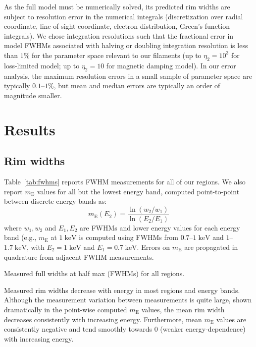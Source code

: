 \documentclass[iop, apj, numberedappendix, twocolappendix]{emulateapj}
\newcommand*{\mt}{\mathrm}
\newcommand*{\unit}[1]{\;\mt{#1}}  %
\newcommand*{\mE}{m_\mt{E}}
\begin{document}
As the full model must be numerically solved, its predicted rim widths are
subject to resolution error in the numerical integrals (discretization over
radial coordinate, line-of-sight coordinate, electron distribution, Green's
function integrals).  We chose integration resolutions such that the
fractional error in model FWHMs associated with halving or doubling integration
resolution is less than $1\%$ for the parameter space relevant to our
filaments (up to $\eta_2 = 10^3$ for loss-limited model; up to $\eta_2 = 10$
for magnetic damping model).  In our error analysis, the maximum resolution
errors in a small sample of parameter space are typically $0.1$--$1\%$,
but mean and median errors are typically an order of magnitude smaller.

\section{Results}

\subsection{Rim widths}
\label{sec:fwhm-results}

Table~\ref{tab:fwhms} reports FWHM measurements for all of our regions.
We also report $\mE$ values for all but the lowest energy band, computed
point-to-point between discrete energy bands as:
\begin{equation}
    \mE(E_2) = \frac{\ln(w_2/w_1)}{\ln(E_2/E_1)}
\end{equation}
where $w_1, w_2$ and $E_1, E_2$ are FWHMs and lower energy values for each
energy band (e.g., $\mE$ at $1 \unit{keV}$ is computed using FWHMs from
$0.7$--$1 \unit{keV}$ and $1$--$1.7 \unit{keV}$, with $E_2 = 1
\unit{keV}$ and $E_1 = 0.7 \unit{keV}$.  Errors on $\mE$ are propagated in
quadrature from adjacent FWHM measurements.

\begin{table*}[ht]
    \scriptsize
    \centering
    \caption{Measured full widths at half max (FWHMs) for all regions.
             \label{tab:fwhms}}
    
\end{table*}

Measured rim widths decrease with energy in most regions and energy bands.
Although the measurement variation between measurements is quite large, shown
dramatically in the point-wise computed $\mE$ values, the mean rim width
decreases consistently with increasing energy.  Furthermore, mean $\mE$ values
are consistently negative and tend smoothly towards $0$ (weaker
energy-dependence) with increasing energy.
\end{document}
